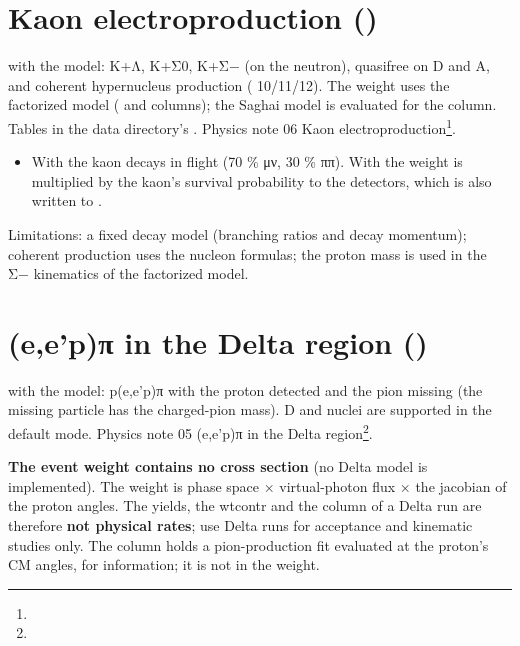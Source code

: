 \section{\texorpdfstring{Kaon electroproduction ()}{Kaon electroproduction (doing\_\allowbreak{}kaon)}}\label{user_manual-05u5freactions:54-kaon-electroproduction-doingu5fkaon}
 with the  model: K+Λ, K+Σ0, K+Σ− (on the neutron), quasifree on D and A, and coherent hypernucleus
production (\hyperref[param:whichu5fkaon]{} 10/11/12). The weight uses the factorized model ( and  columns); the Saghai model
is evaluated for the  column. Tables in the data directory's .
Physics note 06 Kaon electroproduction\footnote{}.


\begin{itemize}
\item With  the kaon decays in flight (70 \% μν, 30 \% ππ). With  the weight is multiplied by
the kaon's survival probability to the detectors, which is also written to .
\end{itemize}
Limitations: a fixed decay model (branching ratios and decay momentum); coherent production uses the nucleon formulas;
the proton mass is used in the Σ− kinematics of the factorized model.

\section{\texorpdfstring{(e,e'p)π in the Delta region ()}{(e,e'p)π in the Delta region (doing\_\allowbreak{}delta)}}\label{user_manual-05u5freactions:55-eepu3c0-in-the-delta-region-doingu5fdelta}
 with the  model: p(e,e'p)π with the proton detected and the pion missing (the missing particle
has the charged-pion mass). D and nuclei are supported in the default mode.
Physics note 05 (e,e'p)π in the Delta region\footnote{}.


\textbf{The event weight contains no cross section} (no Delta model is implemented). The weight is phase space × virtual-photon
flux × the jacobian of the proton angles. The yields, the  wtcontr and the  column of a Delta run are
therefore \textbf{not physical rates}; use Delta runs for acceptance and kinematic studies only. The  column holds a
pion-production fit evaluated at the proton's CM angles, for information; it is not in the weight.


